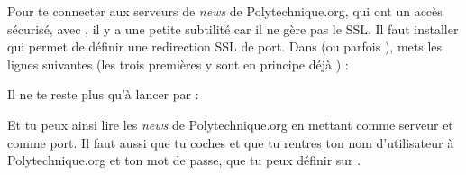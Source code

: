 Pour te connecter aux serveurs de \emph{news} de Polytechnique.org, qui ont un acc\`es s\'ecuris\'e, avec , il y a une petite subtilit\'e car il
ne g\`ere pas le SSL. Il faut installer  qui permet de d\'efinir une redirection SSL de port. Dans  (ou parfois ), mets les lignes suivantes (les trois premi\`eres y sont en principe d\'ej\`a ) :

Il ne te reste plus qu'\`a  lancer  par :

Et tu peux ainsi lire les \emph{news} de Polytechnique.org en mettant  comme serveur et
 comme port. Il faut aussi que tu coches  et
que tu rentres ton nom d'utilisateur \`a  Polytechnique.org et ton mot de passe, que tu peux d\'efinir
sur .

\clearpage
